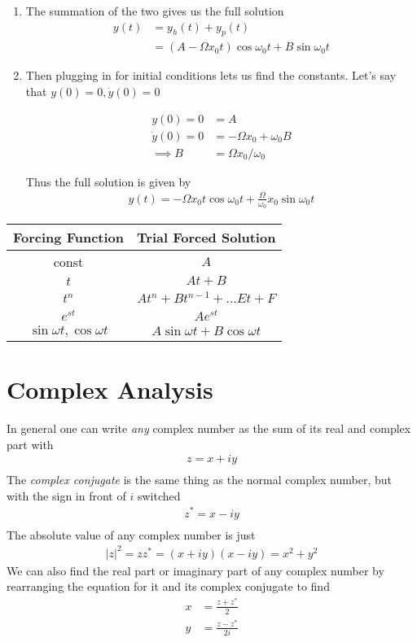 \begin{enumerate}
\item The summation of the two gives us the full solution
\begin{align}
y(t) &= y_h(t) + y_p(t)\\
 &= (A-\Omega x_0 t)\cos\omega_0 t + B\sin\omega_0 t
\end{align}
\item Then plugging in for initial conditions lets us find the constants. Let's say that $y(0) = 0, \dot{y}(0) = 0$

\begin{align}
y(0) = 0 &= A\\
\dot{y}(0) = 0 &= -\Omega x_0 +\omega_0 B\\
\implies B &= \Omega x_0/\omega_0
\end{align}

Thus the full solution is given by
\begin{align}
y(t) = -\Omega x_0 t\cos\omega_0 t +\frac{\Omega}{\omega_0} x_0\sin\omega_0 t
\end{align}



\end{enumerate}


\begin{center}
 \begin{tabular}{||c c||} 
 \hline
Forcing Function & Trial Forced Solution \\ [0.5ex] 
 \hline\hline
 const & $A$  \\ 
 \hline
 $t$ & $At+ B$  \\
 \hline
 $t^n$ & $At^n + Bt^{n-1} + ... Et + F$  \\
 \hline
 $e^{st}$ & $Ae^{st}$ \\
 \hline
 $\sin\omega t, \cos\omega t$ & $A\sin\omega t + B\cos\omega t$   \\ 
 \hline
\end{tabular}\label{forcing}
\end{center}

\section{Complex Analysis}
In general one can write \emph{any} complex number as the sum of its real and complex part with
\begin{align}
	z = x + iy\\
\end{align}	
	The \emph{complex conjugate} is the same thing as the normal complex number, but with the sign in front of  $i$ switched
\begin{align}
	z^* = x - iy\\
\end{align}
The absolute value of any complex number is just
\begin{align}
	|z|^2 = zz^* = (x+iy)(x-iy) = x^2 +y^2
\end{align}
We can also find the real part  or imaginary part of any complex number by rearranging the equation for it and its complex conjugate to find
\begin{align}
	x &= \frac{z+z^*}{2}\\
	y &= \frac{z - z^*}{2i}
\end{align}

